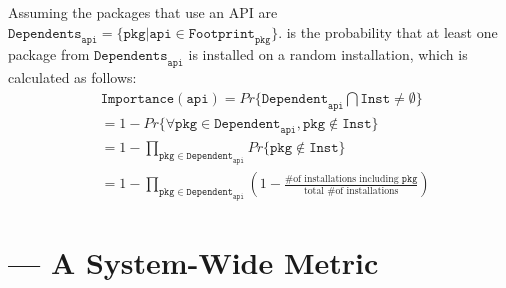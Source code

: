 \noindent
Assuming the packages that use an API are  
$\mathtt{Dependents}_\mathtt{api} = \{\mathtt{pkg}|\mathtt{api} \in \mathtt{Footprint}_\mathtt{pkg}\}$.
\Usagemetric{} is the probability that at least one package
from $\mathtt{Dependents}_\mathtt{api}$ is installed on a random installation, which is calculated as follows:
\begin{align*}
&\mathtt{Importance}(\mathtt{api}) = Pr\{\mathtt{Dependent}_\mathtt{api} \bigcap \mathtt{Inst} \neq \emptyset\} \\
&= 1 - Pr\{\forall \mathtt{pkg} \in \mathtt{Dependent}_\mathtt{api}, \mathtt{pkg} \notin \mathtt{Inst}\} \\
&= 1 - \prod_{\mathtt{pkg} \in \mathtt{Dependent}_\mathtt{api}} Pr\{\mathtt{pkg} \notin \mathtt{Inst}\} \\
&= 1 - \prod_{\mathtt{pkg} \in \mathtt{Dependent}_\mathtt{api}} (1 - \frac{\text{\# of installations including $\mathtt{pkg}$}}{\text{total \# of installations}})
\end{align*}

\section{\CompatMetric{} --- A System-Wide Metric}
\label{sec:defs:compatmetric}





\begin{comment}
We defined {\bf platform compatibility} as "{\em the probability of porting any installation of an OS distribution onto the target OS without any effort}".
The definition of an {\em installation} is a combination of application setup on a standalone OS instance.
An Installation can exist on physical machines,
or any machines of generalized sense such as a virtual machines, containers or subsystems.
In our model, installations represent customers of the OS, who are considered equal when providing any services.
\end{comment}


